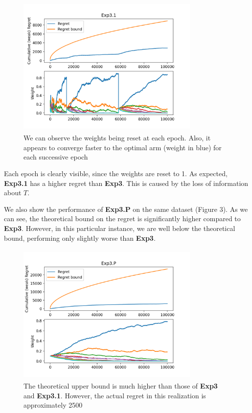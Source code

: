 \documentclass[12pt,a4paper]{article}
\begin{document}
\begin{figure}[!htb]
	\begin{center}
		\includegraphics[width=90mm, height=70mm]{exp31.png}
		\caption{We can observe the weights being reset at each epoch. Also, it appears to converge faster to the optimal arm (weight in blue) for each successive epoch}
	\end{center}
\end{figure}
Each epoch is clearly visible, since the weights are reset to 1. As expected, \textbf{Exp3.1} has a higher regret than \textbf{Exp3}. This is caused by the loss of information about $T$.

We also show the performance of \textbf{Exp3.P} on the same dataset (Figure 3). As we can see, the theoretical bound on the regret is significantly higher compared to \textbf{Exp3}. However, in this particular instance, we are well below the theoretical bound, performing only slightly worse than \textbf{Exp3}.
\begin{figure}[!htb]
	\begin{center}
		\includegraphics[width=90mm, height=70mm]{exp3P.png}
		\caption{The theoretical upper bound is much higher than those of \textbf{Exp3} and \textbf{Exp3.1}. However, the actual regret in this realization is approximately 2500}
	\end{center}
\end{figure}
\end{document}
